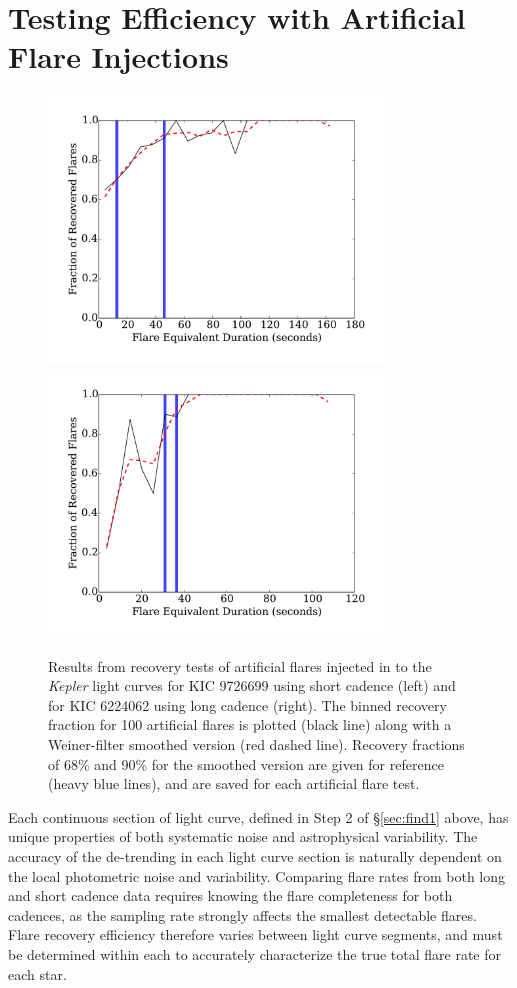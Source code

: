 \documentclass[twocolumn]{aastex6}
\newcommand{\Kepler}{\textsl{Kepler}\xspace}
\begin{document}
\section{Testing Efficiency with Artificial Flare Injections}
\label{sec:fakeflares}


\begin{figure}[!t]
\centering
\includegraphics[width=3.5in]{fig2a}
\includegraphics[width=3.5in]{fig2b}
\caption{
Results from recovery tests of artificial flares injected in to the \Kepler light curves for KIC 9726699 using short cadence (left) and for KIC 6224062 using long cadence (right). The binned recovery fraction for 100 artificial flares is plotted (black line) along with a Weiner-filter smoothed version (red dashed line). Recovery fractions of 68\% and 90\% for the smoothed version are given for reference (heavy blue lines), and are saved for each artificial flare test.
}
\label{fig:fake1}
\end{figure}


Each continuous section of light curve, defined in Step 2 of \S\ref{sec:find1} above, has unique properties of both systematic noise and astrophysical variability. The accuracy of the de-trending in each light curve section is naturally dependent on the local photometric noise and variability. Comparing flare rates from both long and short cadence data  requires knowing the flare completeness for both cadences, as the sampling rate strongly affects the smallest detectable flares.
Flare recovery efficiency therefore varies between light curve segments, and must be determined within each to accurately characterize the true total flare rate for each star.
\end{document}
